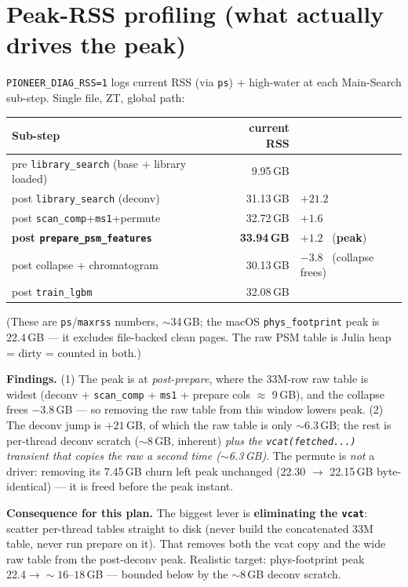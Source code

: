 \documentclass[11pt]{article}
\newcommand{\code}[1]{\texttt{\small #1}}
\begin{document}
\section{Peak-RSS profiling (what actually drives the peak)}
\code{PIONEER\_DIAG\_RSS=1} logs current RSS (via \code{ps}) + high-water at each Main-Search
sub-step. Single file, ZT, global path:
\begin{center}\begin{tabular}{lrl}
\toprule
Sub-step & current RSS & \\
\midrule
pre \code{library\_search} (base + library loaded) & 9.95\,GB & \\
post \code{library\_search} (deconv) & 31.13\,GB & \(+21.2\) \\
post \code{scan\_comp}+\code{ms1}+permute & 32.72\,GB & \(+1.6\) \\
\textbf{post \code{prepare\_psm\_features}} & \textbf{33.94\,GB} & \(+1.2\) \ (\textbf{peak}) \\
post collapse + chromatogram & 30.13\,GB & \(-3.8\) \ (collapse frees) \\
post \code{train\_lgbm} & 32.08\,GB & \\
\bottomrule
\end{tabular}\end{center}
(These are \code{ps}/\code{maxrss} numbers, \(\sim\)34\,GB; the macOS \code{phys\_footprint}
peak is 22.4\,GB --- it excludes file-backed clean pages. The raw PSM table is Julia heap =
dirty = counted in both.)

\textbf{Findings.} (1) The peak is at \emph{post-prepare}, where the 33M-row raw table is
widest (deconv + \code{scan\_comp} + \code{ms1} + prepare cols \(\approx\) 9\,GB), and the
collapse frees \(-3.8\)\,GB --- so removing the raw table from this window lowers peak.
(2) The deconv jump is \(+21\)\,GB, of which the raw table is only \(\sim\)6.3\,GB; the rest is
per-thread deconv scratch (\(\sim\)8\,GB, inherent) \emph{plus the \code{vcat(fetched...)}
transient that copies the raw a second time (\(\sim\)6.3\,GB)}. The permute is \emph{not} a
driver: removing its 7.45\,GB churn left peak unchanged (22.30 \(\to\) 22.15\,GB byte-identical)
--- it is freed before the peak instant.

\textbf{Consequence for this plan.} The biggest lever is \textbf{eliminating the \code{vcat}}:
scatter per-thread tables straight to disk (never build the concatenated 33M table, never run
prepare on it). That removes both the vcat copy and the wide raw table from the post-deconv
peak. Realistic target: phys-footprint peak \(22.4 \to \sim16\text{--}18\)\,GB --- bounded below
by the \(\sim\)8\,GB deconv scratch.
\end{document}
